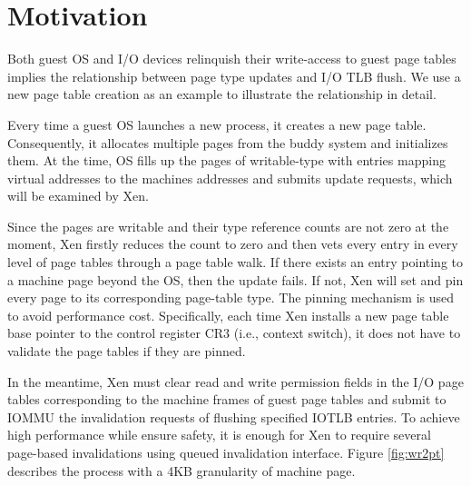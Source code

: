 \section{Motivation}






Both guest OS and I/O devices relinquish their write-access to guest page tables implies the relationship between page type updates and I/O TLB flush. We use a new page table creation as an example to illustrate the relationship in detail.

Every time a guest OS launches a new process, it creates a new page table. Consequently, it allocates multiple pages from the buddy system and initializes them. At the time, OS fills up the pages of writable-type with entries mapping virtual addresses to the machines addresses and submits update requests, which will be examined by Xen.

Since the pages are writable and their type reference counts are not zero at the moment, Xen firstly reduces the count to zero and then vets every entry in every level of page tables through a page table walk. If there exists an entry pointing to a machine page beyond the OS, then the update fails. If not, Xen will set and pin every page to its corresponding page-table type. The pinning mechanism is used to avoid performance cost. Specifically, each time Xen installs a new page table base pointer to the control register CR3 (i.e., context switch), it does not have to validate the page tables if they are pinned.

In the meantime, Xen must clear read and write permission fields in the I/O page tables corresponding to the machine frames of guest page tables and submit to IOMMU the invalidation requests of flushing specified IOTLB entries. To achieve high performance while ensure safety, it is enough for Xen to require several page-based invalidations using queued invalidation interface. Figure \ref{fig:wr2pt} describes the process with a 4KB granularity of machine page.

